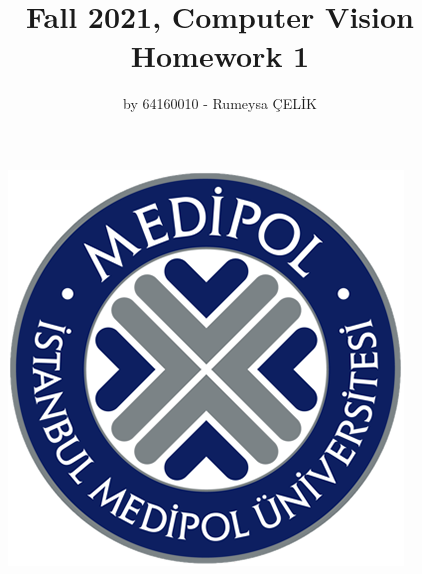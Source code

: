 \documentclass[a4paper, 12pt]{report}
\begin{document}
\begin{figure}
\includegraphics[scale=.63]{medipol.png}
\centering
\end{figure}
\begin{titlepage}
\title{Fall 2021, Computer Vision \\ Homework 1}
\author{by 64160010 - Rumeysa ÇELİK}
\maketitle
\end{titlepage}
\end{document}
